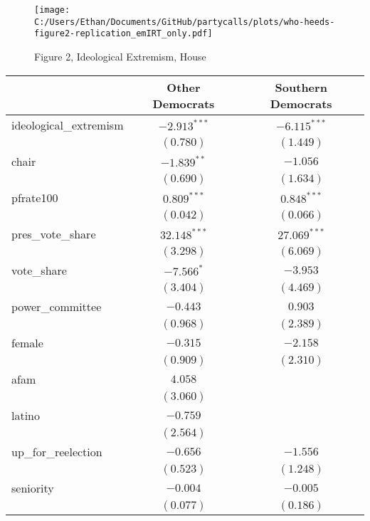 \documentclass[12pt]{article}
\begin{document}
\begin{figure}[ht]
	\caption{Figure 2, Ideological Extremism, House}
	\centering
	\texttt{[image: C:/Users/Ethan/Documents/GitHub/partycalls/plots/who-heeds-figure2-replication\_emIRT\_only.pdf]}
	
\end{figure}


\begin{table}
	\begin{center}
		\begin{tabular}{l c c }
			\hline
			& Other Democrats & Southern Democrats \\
			\hline
			ideological\_extremism & $-2.913^{***}$ & $-6.115^{***}$ \\
			& $(0.780)$      & $(1.449)$      \\
			chair                  & $-1.839^{**}$  & $-1.056$       \\
			& $(0.690)$      & $(1.634)$      \\
			pfrate100              & $0.809^{***}$  & $0.848^{***}$  \\
			& $(0.042)$      & $(0.066)$      \\
			pres\_vote\_share      & $32.148^{***}$ & $27.069^{***}$ \\
			& $(3.298)$      & $(6.069)$      \\
			vote\_share            & $-7.566^{*}$   & $-3.953$       \\
			& $(3.404)$      & $(4.469)$      \\
			power\_committee       & $-0.443$       & $0.903$        \\
			& $(0.968)$      & $(2.389)$      \\
			female                 & $-0.315$       & $-2.158$       \\
			& $(0.909)$      & $(2.310)$      \\
			afam                   & $4.058$        &                \\
			& $(3.060)$      &                \\
			latino                 & $-0.759$       &                \\
			& $(2.564)$      &                \\
			up\_for\_reelection    & $-0.656$       & $-1.556$       \\
			& $(0.523)$      & $(1.248)$      \\
			seniority              & $-0.004$       & $-0.005$       \\
			& $(0.077)$      & $(0.186)$      \\

\end{tabular}
\end{center}
\end{table}
\end{document}
